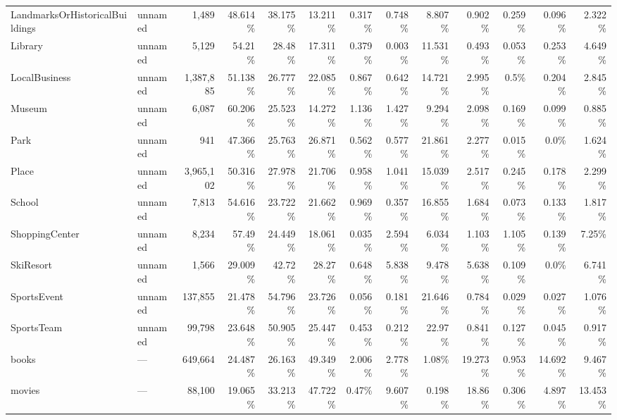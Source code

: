 \begin{table}[t]
{\begin{tabular}{llrrrrrrrrrrr}
LandmarksOrHistoricalBuildings & unnamed & 1{,}489 & 48.614\% & 38.175\% & 13.211\% & 0.317\% & 0.748\% & 8.807\% & 0.902\% & 0.259\% & 0.096\% & 2.322\% \\
Library & unnamed & 5{,}129 & 54.21\% & 28.48\% & 17.311\% & 0.379\% & 0.003\% & 11.531\% & 0.493\% & 0.053\% & 0.253\% & 4.649\% \\
LocalBusiness & unnamed & 1{,}387{,}885 & 51.138\% & 26.777\% & 22.085\% & 0.867\% & 0.642\% & 14.721\% & 2.995\% & 0.5\% & 0.204\% & 2.845\% \\
Museum & unnamed & 6{,}087 & 60.206\% & 25.523\% & 14.272\% & 1.136\% & 1.427\% & 9.294\% & 2.098\% & 0.169\% & 0.099\% & 0.885\% \\
Park & unnamed & 941 & 47.366\% & 25.763\% & 26.871\% & 0.562\% & 0.577\% & 21.861\% & 2.277\% & 0.015\% & 0.0\% & 1.624\% \\
Place & unnamed & 3{,}965{,}102 & 50.316\% & 27.978\% & 21.706\% & 0.958\% & 1.041\% & 15.039\% & 2.517\% & 0.245\% & 0.178\% & 2.299\% \\
School & unnamed & 7{,}813 & 54.616\% & 23.722\% & 21.662\% & 0.969\% & 0.357\% & 16.855\% & 1.684\% & 0.073\% & 0.133\% & 1.817\% \\
ShoppingCenter & unnamed & 8{,}234 & 57.49\% & 24.449\% & 18.061\% & 0.035\% & 2.594\% & 6.034\% & 1.103\% & 1.105\% & 0.139\% & 7.25\% \\
SkiResort & unnamed & 1{,}566 & 29.009\% & 42.72\% & 28.27\% & 0.648\% & 5.838\% & 9.478\% & 5.638\% & 0.109\% & 0.0\% & 6.741\% \\
SportsEvent & unnamed & 137{,}855 & 21.478\% & 54.796\% & 23.726\% & 0.056\% & 0.181\% & 21.646\% & 0.784\% & 0.029\% & 0.027\% & 1.076\% \\
SportsTeam & unnamed & 99{,}798 & 23.648\% & 50.905\% & 25.447\% & 0.453\% & 0.212\% & 22.97\% & 0.841\% & 0.127\% & 0.045\% & 0.917\% \\
\midrule
books & --- & 649{,}664 & 24.487\% & 26.163\% & 49.349\% & 2.006\% & 2.778\% & 1.08\% & 19.273\% & 0.953\% & 14.692\% & 9.467\% \\
movies & --- & 88{,}100 & 19.065\% & 33.213\% & 47.722\% & 0.47\% & 9.607\% & 0.198\% & 18.86\% & 0.306\% & 4.897\% & 13.453\% \\
\bottomrule
\end{tabular}}
\end{table}
